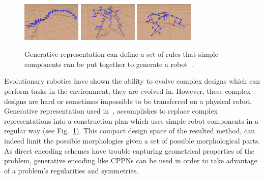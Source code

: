 \begin{figure}[h!]
\centering
\includegraphics[width=0.25\textwidth,height=0.2\textwidth]{../Figures/Misc/rules1.png}
\includegraphics[width=0.25\textwidth,height=0.2\textwidth]{../Figures/Misc/rules2.png}
\includegraphics[width=0.25\textwidth,height=0.2\textwidth]{../Figures/Misc/rules3.png}
\caption{Generative representation can define a set of rules that simple components can be put together to generate a robot~\citep{hornby2003generative}.}
\label{fig:rules}
\end{figure}

Evolutionary robotics have shown the ability to evolve complex designs which can perform tasks in the environment, they are evolved in. However, these complex designs are hard or sometimes impossible to be transferred on a physical robot. Generative representation used in~\citep{hornby2003generative}, accomplishes to replace complex representations into a construction plan which uses simple robot components in a regular way (see Fig.~\ref{fig:rules}). This compact design space of the resulted method, can indeed limit the possible morphologies given a set of possible morphological parts. As direct encoding schemes have trouble capturing geometrical properties of the problem, generative encoding like CPPNs can be used in order to take advantage of a problem's regularities and symmetries.

